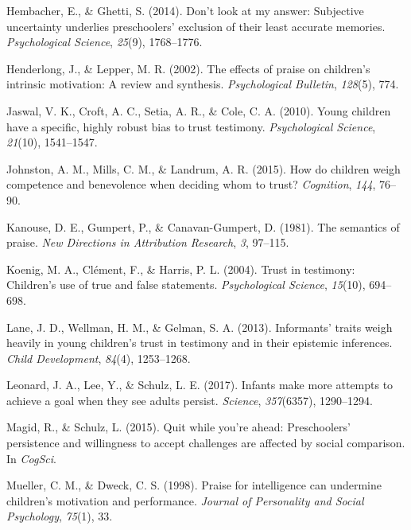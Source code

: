 \documentclass[10pt, letterpaper]{article}
\begin{document}
\hypertarget{ref-hembacher2014don}{}
Hembacher, E., \& Ghetti, S. (2014). Don't look at my answer: Subjective
uncertainty underlies preschoolers' exclusion of their least accurate
memories. \emph{Psychological Science}, \emph{25}(9), 1768--1776.

\hypertarget{ref-henderlong2002effects}{}
Henderlong, J., \& Lepper, M. R. (2002). The effects of praise on
children's intrinsic motivation: A review and synthesis.
\emph{Psychological Bulletin}, \emph{128}(5), 774.

\hypertarget{ref-jaswal2010young}{}
Jaswal, V. K., Croft, A. C., Setia, A. R., \& Cole, C. A. (2010). Young
children have a specific, highly robust bias to trust testimony.
\emph{Psychological Science}, \emph{21}(10), 1541--1547.

\hypertarget{ref-johnston2015children}{}
Johnston, A. M., Mills, C. M., \& Landrum, A. R. (2015). How do children
weigh competence and benevolence when deciding whom to trust?
\emph{Cognition}, \emph{144}, 76--90.

\hypertarget{ref-kanouse1981semantics}{}
Kanouse, D. E., Gumpert, P., \& Canavan-Gumpert, D. (1981). The
semantics of praise. \emph{New Directions in Attribution Research},
\emph{3}, 97--115.

\hypertarget{ref-koenig2004trust}{}
Koenig, M. A., Clément, F., \& Harris, P. L. (2004). Trust in testimony:
Children's use of true and false statements. \emph{Psychological
Science}, \emph{15}(10), 694--698.

\hypertarget{ref-lane2013informants}{}
Lane, J. D., Wellman, H. M., \& Gelman, S. A. (2013). Informants' traits
weigh heavily in young children's trust in testimony and in their
epistemic inferences. \emph{Child Development}, \emph{84}(4),
1253--1268.

\hypertarget{ref-leonard2017infants}{}
Leonard, J. A., Lee, Y., \& Schulz, L. E. (2017). Infants make more
attempts to achieve a goal when they see adults persist. \emph{Science},
\emph{357}(6357), 1290--1294.

\hypertarget{ref-magid2015quit}{}
Magid, R., \& Schulz, L. (2015). Quit while you're ahead: Preschoolers'
persistence and willingness to accept challenges are affected by social
comparison. In \emph{CogSci}.

\hypertarget{ref-mueller1998praise}{}
Mueller, C. M., \& Dweck, C. S. (1998). Praise for intelligence can
undermine children's motivation and performance. \emph{Journal of
Personality and Social Psychology}, \emph{75}(1), 33.
\end{document}
